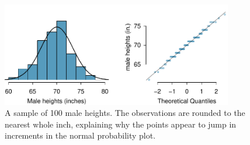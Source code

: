\begin{figure}
\centering
\includegraphics[width=0.9\textwidth]{02/figures/fcidMHeights/fcidMHeights}
\caption{A sample of 100 male heights. The observations are rounded to the nearest whole inch, explaining why the points appear to jump in increments in the normal probability plot.}
\label{fcidMHeights}
\end{figure}

